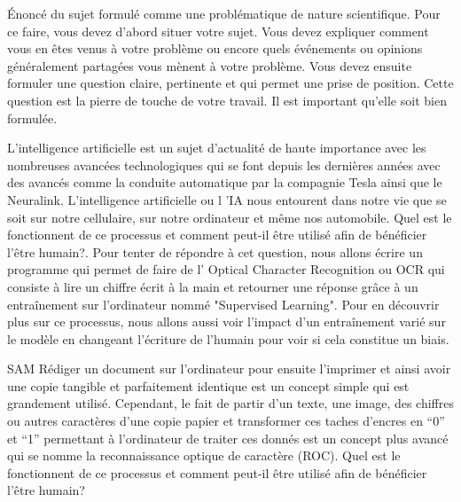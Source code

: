 Énoncé du sujet formulé comme une problématique de nature scientifique. Pour ce faire, vous devez
d’abord situer votre sujet. Vous devez expliquer comment vous en êtes venus à votre problème ou encore
quels événements ou opinions généralement partagées vous mènent à votre problème. Vous devez ensuite
formuler une question claire, pertinente et qui permet une prise de position. Cette question est la pierre
de touche de votre travail. Il est important qu’elle soit bien formulée. 

L'intelligence artificielle est un sujet d'actualité de haute importance avec les nombreuses avancées 
technologiques qui se font depuis les dernières années avec des avancés comme la conduite automatique par la compagnie Tesla ainsi que le Neuralink. L'intelligence artificielle ou l 'IA nous entourent dans notre vie que se soit sur notre cellulaire, sur notre ordinateur
et même nos automobile. Quel est le fonctionnent de ce processus et comment peut-il être utilisé afin de bénéficier l’être humain?. 
Pour tenter de répondre à cet question, nous allons écrire un programme qui permet de faire de l' Optical Character Recognition ou OCR 
qui consiste à lire un chiffre écrit à la main et retourner une réponse grâce à un entraînement sur l'ordinateur 
nommé "Supervised Learning". Pour en découvrir plus sur ce processus, nous allons aussi voir l'impact d'un 
entraînement varié sur le modèle en changeant l'écriture de l'humain pour voir si cela constitue un biais.

SAM
Rédiger un document sur l’ordinateur pour ensuite l’imprimer et ainsi avoir une copie tangible et parfaitement identique est un concept simple qui est grandement utilisé. Cependant, le fait de partir d’un texte, une image, des chiffres ou autres caractères d’une copie papier et transformer ces taches d’encres en “0” et “1” permettant à l’ordinateur de traiter ces donnés est un concept plus avancé qui se nomme la reconnaissance optique de caractère (ROC). Quel est le fonctionnent de ce processus et comment peut-il être utilisé afin de bénéficier l’être humain?

